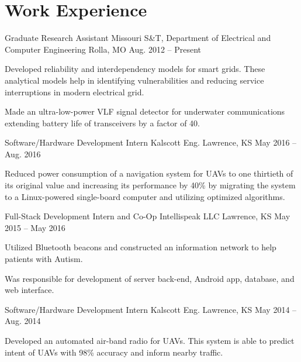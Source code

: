 \section{Work Experience}
\begin{cventries}
  \cventry
    {Graduate Research Assistant}
    {Missouri S\&T, Department of Electrical and Computer Engineering}
    {Rolla, MO}
    {Aug. 2012 -- Present}
    {
      \begin{cvitems}
        \item Developed reliability and interdependency models for smart grids. These analytical models help in identifying vulnerabilities and reducing service interruptions in modern electrical grid.
        \item Made an ultra-low-power VLF signal detector for underwater communications extending battery life of transceivers by a factor of 40.
      \end{cvitems}
    }
  \cventry
    {Software/Hardware Development Intern}
    {Kalscott Eng.}
    {Lawrence, KS}
    {May 2016 -- Aug. 2016}
    {
      \begin{cvitems}
        \item Reduced power consumption of a navigation system for UAVs to one thirtieth of its original value and increasing its performance by 40\% by migrating the system to a Linux-powered single-board computer and utilizing optimized algorithms.
      \end{cvitems}
    }
  \cventry
    {Full-Stack Development Intern and Co-Op}
    {Intellispeak LLC}
    {Lawrence, KS}
    {May 2015 -- May 2016}
    {
      \begin{cvitems}
        \item Utilized Bluetooth beacons and constructed an information network to help patients with Autism.
        \item Was responsible for development of server back-end, Android app, database, and web interface.
      \end{cvitems}
    }
  \cventry
    {Software/Hardware Development Intern}
    {Kalscott Eng.}
    {Lawrence, KS}
    {May 2014 -- Aug. 2014}
    {
      \begin{cvitems}
        \item Developed an automated air-band radio for UAVs. This system is able to predict intent of UAVs with 98\% accuracy and inform nearby traffic.

\end{cvitems}}
\end{cventries}
